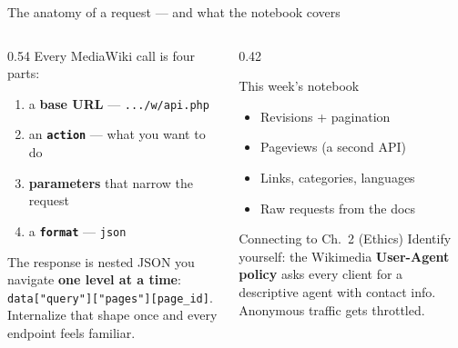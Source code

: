 \documentclass[9pt,aspectratio=169]{beamer}
\begin{document}
\begin{frame}{The anatomy of a request --- and what the notebook covers}
    \begin{columns}[T]
        \begin{column}{0.54\textwidth}
            Every MediaWiki call is four parts:
            \begin{enumerate}\small
                \item a \textbf{base URL} --- \texttt{.../w/api.php}
                \item an \texttt{\textbf{action}} --- what you want to do
                \item \textbf{parameters} that narrow the request
                \item a \texttt{\textbf{format}} --- \texttt{json}
            \end{enumerate}

            \vspace{0.6em}

            The response is nested JSON you navigate \textbf{one level at a time}: \texttt{data["query"]["pages"][page\_id]}. Internalize that shape once and every endpoint feels familiar.
        \end{column}
        \begin{column}{0.42\textwidth}
            \begin{block}{This week's notebook}
                \footnotesize
                \begin{itemize}\footnotesize
                    \item Revisions + pagination
                    \item Pageviews (a second API)
                    \item Links, categories, languages
                    \item Raw requests from the docs
                \end{itemize}
            \end{block}
            \begin{alertblock}{Connecting to Ch.~2 (Ethics)}
                \footnotesize Identify yourself: the Wikimedia \textbf{User-Agent policy} asks every client for a descriptive agent with contact info. Anonymous traffic gets throttled.
            \end{alertblock}
        \end{column}
    \end{columns}
\end{frame}
\end{document}
